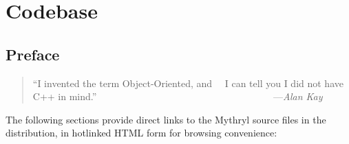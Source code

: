 \chapter{Codebase}

%
%

\label{chapter:codebase}
\section{Preface}
\label{chapter:code:preface}

\begin{quotation}\begin{tiny}
      ``I invented the term Object-Oriented, and\newline
      ~~I can tell you I did not have C++ in mind.''\newline
      ~~~~~~~~~~~~~~~~~~~~~~~~~~~~~~~~~~~~---{\em Alan Kay}
\end{tiny}\end{quotation}

The following sections provide direct links to the Mythryl 
source files in the distribution, in hotlinked {\sc HTML} 
form for browsing convenience:





